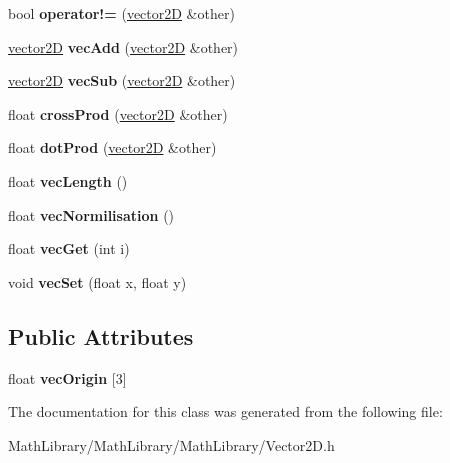\begin{DoxyCompactItemize}
\mbox{\label{classvector2_d_a7ce0310a8d1341ff9ee82eef54255df9}} 
bool {\bfseries operator!=} (\hyperlink{classvector2_d}{vector2D} \&other)
\item 
\mbox{\label{classvector2_d_a3f9d389f0ed3871a37c51d4285ec65ee}} 
\hyperlink{classvector2_d}{vector2D} {\bfseries vec\+Add} (\hyperlink{classvector2_d}{vector2D} \&other)
\item 
\mbox{\label{classvector2_d_ae1cb9fcd811f99ab283d1a073e68c1f1}} 
\hyperlink{classvector2_d}{vector2D} {\bfseries vec\+Sub} (\hyperlink{classvector2_d}{vector2D} \&other)
\item 
\mbox{\label{classvector2_d_a84f14283307cc00c2cce8a10c2c56285}} 
float {\bfseries cross\+Prod} (\hyperlink{classvector2_d}{vector2D} \&other)
\item 
\mbox{\label{classvector2_d_af979d644a49d641f386e34c7093aba35}} 
float {\bfseries dot\+Prod} (\hyperlink{classvector2_d}{vector2D} \&other)
\item 
\mbox{\label{classvector2_d_a9cf55fe082abc0bc2b761b565f874fba}} 
float {\bfseries vec\+Length} ()
\item 
\mbox{\label{classvector2_d_a088813a3bbad2cf0fb5013ac15816b44}} 
float {\bfseries vec\+Normilisation} ()
\item 
\mbox{\label{classvector2_d_a4d3bfd5bf7cf0e5dd49e391137c71090}} 
float {\bfseries vec\+Get} (int i)
\item 
\mbox{\label{classvector2_d_a7cb11e00ab5a8068b14c4b26e2d93ca3}} 
void {\bfseries vec\+Set} (float x, float y)
\end{DoxyCompactItemize}
\subsection*{Public Attributes}
\begin{DoxyCompactItemize}
\item 
\mbox{\label{classvector2_d_a8984cd7fd55daf651ec408e754e415b7}} 
float {\bfseries vec\+Origin} \mbox{[}3\mbox{]}
\end{DoxyCompactItemize}


The documentation for this class was generated from the following file\+:\begin{DoxyCompactItemize}
\item 
Math\+Library/\+Math\+Library/\+Math\+Library/Vector2\+D.\+h\end{DoxyCompactItemize}
